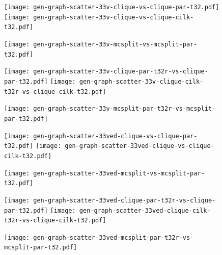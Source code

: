 \documentclass{llncs}
\begin{document}
\begin{figure}[p]
    \texttt{[image: gen-graph-scatter-33v-clique-vs-clique-par-t32.pdf]}
    \hfill
    \texttt{[image: gen-graph-scatter-33v-clique-vs-clique-cilk-t32.pdf]}

    \vspace*{1em}

    \texttt{[image: gen-graph-scatter-33v-mcsplit-vs-mcsplit-par-t32.pdf]}
\end{figure}

\begin{figure}[p]
    \texttt{[image: gen-graph-scatter-33v-clique-par-t32r-vs-clique-par-t32.pdf]}
    \hfill
    \texttt{[image: gen-graph-scatter-33v-clique-cilk-t32r-vs-clique-cilk-t32.pdf]}

    \vspace*{1em}

    \texttt{[image: gen-graph-scatter-33v-mcsplit-par-t32r-vs-mcsplit-par-t32.pdf]}

\end{figure}

\begin{figure}[p]
    \texttt{[image: gen-graph-scatter-33ved-clique-vs-clique-par-t32.pdf]}
    \hfill
    \texttt{[image: gen-graph-scatter-33ved-clique-vs-clique-cilk-t32.pdf]}

    \vspace*{1em}

    \texttt{[image: gen-graph-scatter-33ved-mcsplit-vs-mcsplit-par-t32.pdf]}
\end{figure}

\begin{figure}[p]
    \texttt{[image: gen-graph-scatter-33ved-clique-par-t32r-vs-clique-par-t32.pdf]}
    \hfill
    \texttt{[image: gen-graph-scatter-33ved-clique-cilk-t32r-vs-clique-cilk-t32.pdf]}

    \vspace*{1em}

    \texttt{[image: gen-graph-scatter-33ved-mcsplit-par-t32r-vs-mcsplit-par-t32.pdf]}

\end{figure}
\end{document}
